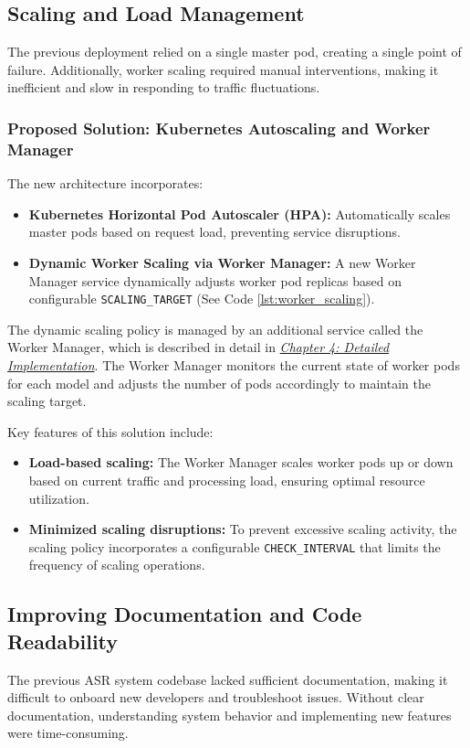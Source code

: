 \subsection{Scaling and Load Management}
The previous deployment relied on a single master pod, creating a single point of failure. Additionally, worker scaling required manual interventions, making it inefficient and slow in responding to traffic fluctuations.

\subsubsection{Proposed Solution: Kubernetes Autoscaling and Worker Manager}
The new architecture incorporates:
\begin{itemize}
    \item \textbf{Kubernetes Horizontal Pod Autoscaler (HPA):} Automatically scales master pods based on request load, preventing service disruptions.
    \item \textbf{Dynamic Worker Scaling via Worker Manager:} A new Worker Manager service dynamically adjusts worker pod replicas based on configurable \texttt{SCALING\_TARGET} (See Code \ref{lst:worker_scaling}).
\end{itemize}

The dynamic scaling policy is managed by an additional service called the Worker Manager, which is described in detail in \hyperref[section:worker_manager]{\textit{Chapter 4: Detailed Implementation}}. The Worker Manager monitors the current state of worker pods for each model and adjusts the number of pods accordingly to maintain the scaling target.

Key features of this solution include:
\begin{itemize}
    \item \textbf{Load-based scaling:}  The Worker Manager scales worker pods up or down based on current traffic and processing load, ensuring optimal resource utilization.
    \item \textbf{Minimized scaling disruptions:}  To prevent excessive scaling activity, the scaling policy incorporates a configurable \texttt{CHECK\_INTERVAL} that limits the frequency of scaling operations.
\end{itemize}

\subsection{Improving Documentation and Code Readability}
The previous ASR system codebase lacked sufficient documentation, making it difficult to onboard new developers and troubleshoot issues. Without clear documentation, understanding system behavior and implementing new features were time-consuming.

